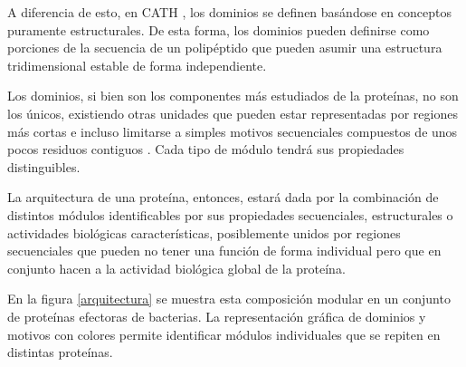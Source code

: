 A diferencia de esto, en CATH \cite{orengo1997cath}, los dominios se definen basándose en conceptos puramente estructurales. 
De esta forma, los dominios pueden definirse como porciones de la secuencia de un polipéptido que pueden asumir una estructura tridimensional estable de forma independiente. 

Los dominios, si bien son los componentes más estudiados de la proteínas, no son los únicos, existiendo otras unidades que pueden estar representadas por 
regiones más cortas e incluso limitarse a simples motivos secuenciales compuestos de unos pocos residuos contiguos \cite{van2014short}.
Cada tipo de módulo tendrá sus propiedades distinguibles.

La arquitectura de una proteína, entonces, estará dada por la combinación de distintos módulos identificables por sus propiedades secuenciales, estructurales o actividades biológicas características, 
posiblemente unidos por regiones secuenciales que pueden no tener una función de forma individual pero que en conjunto hacen a la actividad biológica global de la proteína.

En la figura \ref{arquitectura} se muestra esta composición modular en un conjunto de proteínas efectoras de bacterias.
La representación gráfica de dominios y motivos con colores permite identificar módulos individuales que se repiten en distintas proteínas.

